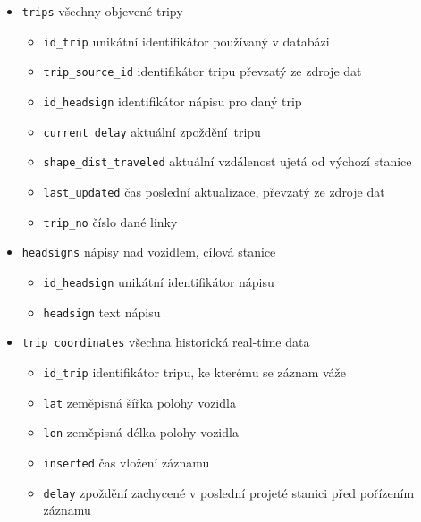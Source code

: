 \begin{itemize}
	\item \verb-trips- všechny objevené tripy

		\begin{itemize}
			\item \verb-id_trip- unikátní identifikátor používaný v databázi

			\item \verb-trip_source_id- identifikátor tripu převzatý ze zdroje dat

			\item \verb-id_headsign- identifikátor nápisu pro daný trip

			\item \verb-current_delay- aktuální zpoždění tripu

			\item \verb-shape_dist_traveled- aktuální vzdálenost ujetá od výchozí stanice

			\item \verb-last_updated- čas poslední aktualizace, převzatý ze zdroje dat

			\item \verb-trip_no- číslo dané linky
		\end{itemize}

	\item \verb-headsigns- nápisy nad vozidlem, cílová stanice

		\begin{itemize}
			\item \verb-id_headsign- unikátní identifikátor nápisu

			\item \verb-headsign- text nápisu
		\end{itemize}

	\item \verb-trip_coordinates- všechna historická real-time data

		\begin{itemize}
			\item \verb-id_trip- identifikátor tripu, ke kterému se záznam váže

			\item \verb-lat- zeměpisná šířka polohy vozidla

			\item \verb-lon- zeměpisná délka polohy vozidla

			\item \verb-inserted- čas vložení záznamu

			\item \verb-delay- zpoždění zachycené v poslední projeté stanici před pořízením záznamu


\end{itemize}
\end{itemize}
